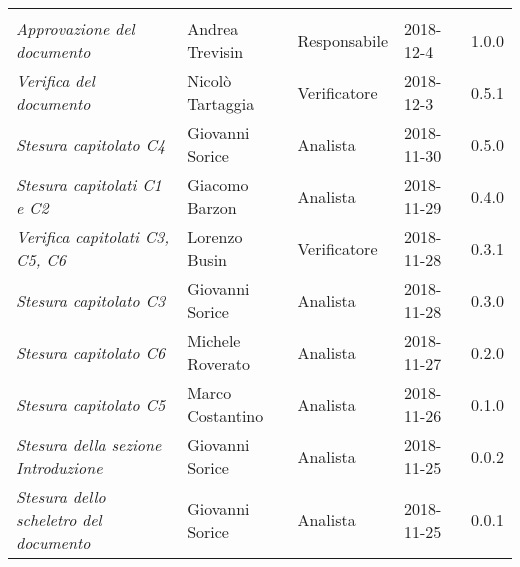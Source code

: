 \newpage 
\section*{}
\begin{table}[H]
	\centering
	\begin{tabular}{p{4cm}|C{3cm}|C{3cm}|R{2.5cm}|R{2cm}}
		
		 & & & & \\
		
		
		\emph{Approvazione del documento} & Andrea Trevisin & Responsabile & 2018-12-4 & 1.0.0 \\
		\hline
		
		\emph{Verifica del documento} & Nicolò Tartaggia & Verificatore & 2018-12-3 & 0.5.1 \\
		\hline
		
		\emph{Stesura capitolato C4 } & Giovanni Sorice & Analista & 2018-11-30 & 0.5.0 \\
		\hline
		
		\emph{Stesura capitolati C1 e C2} & Giacomo Barzon & Analista & 2018-11-29 & 0.4.0 \\
		\hline
		
		\emph{Verifica capitolati C3, C5, C6} & Lorenzo Busin & Verificatore & 2018-11-28 & 0.3.1 \\
		\hline
		
		\emph{Stesura capitolato C3 } & Giovanni Sorice & Analista & 2018-11-28 & 0.3.0 \\
		\hline
		
		\emph{Stesura capitolato C6 } & Michele Roverato & Analista & 2018-11-27 & 0.2.0 \\
		\hline
		
		\emph{Stesura capitolato C5 } & Marco Costantino & Analista & 2018-11-26 & 0.1.0 \\
		\hline
		
		\emph{Stesura della sezione Introduzione } & Giovanni Sorice & Analista & 2018-11-25 & 0.0.2 \\
		\hline
		
		\emph{Stesura dello scheletro del documento} & Giovanni Sorice & Analista & 2018-11-25 & 0.0.1 \\
		
	\end{tabular}
	
\end{table}


\clearpage